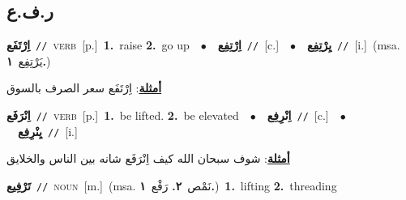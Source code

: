 \documentclass[10pt,a4paper,twoside]{article} %
\begin{document}
\begin{multicols}{2}
\vspace{-3mm}
\subsection*{\color{blue}\foreignlanguage{arabic}{ر.ف.ع}\color{blue}{}} 

{\setlength\topsep{0pt}\textbf{\foreignlanguage{arabic}{اِرْتَفَع}}\ {\color{gray}\texttt{//}\color{black}}\ \textsc{verb}\ [p.]\ \textbf{1.}~raise  \textbf{2.}~go up\ \ $\bullet$\ \ \setlength\topsep{0pt}\textbf{\foreignlanguage{arabic}{اِرْتِفِع}}\ {\color{gray}\texttt{//}\color{black}}\ [c.]\ \ $\bullet$\ \ \setlength\topsep{0pt}\textbf{\foreignlanguage{arabic}{يِرْتِفِع}}\ {\color{gray}\texttt{//}\color{black}}\ [i.]\ \color{gray}(msa. \foreignlanguage{arabic}{يَرْتِفِع}~\foreignlanguage{arabic}{\textbf{١.}})\color{black}\  \begin{flushright}\color{gray}\foreignlanguage{arabic}{\textbf{\underline{\foreignlanguage{arabic}{أمثلة}}}: اِرْتَفَع سعر الصرف بالسوق}\end{flushright}\color{black}} \vspace{2mm}

{\setlength\topsep{0pt}\textbf{\foreignlanguage{arabic}{اِنْرَفَع}}\ {\color{gray}\texttt{//}\color{black}}\ \textsc{verb}\ [p.]\ \textbf{1.}~be lifted.  \textbf{2.}~be elevated\ \ $\bullet$\ \ \setlength\topsep{0pt}\textbf{\foreignlanguage{arabic}{اِنْرِفِع}}\ {\color{gray}\texttt{//}\color{black}}\ [c.]\ \ $\bullet$\ \ \setlength\topsep{0pt}\textbf{\foreignlanguage{arabic}{يِنْرِفِع}}\ {\color{gray}\texttt{//}\color{black}}\ [i.]\  \begin{flushright}\color{gray}\foreignlanguage{arabic}{\textbf{\underline{\foreignlanguage{arabic}{أمثلة}}}: شوف سبحان الله كيف اِنْرَفَع شانه بين الناس والخلايق}\end{flushright}\color{black}} \vspace{2mm}

{\setlength\topsep{0pt}\textbf{\foreignlanguage{arabic}{تَرْفِيع}}\ {\color{gray}\texttt{//}\color{black}}\ \textsc{noun}\ [m.]\ \color{gray}(msa. \foreignlanguage{arabic}{نَمْص}~\foreignlanguage{arabic}{\textbf{٢.}}  \foreignlanguage{arabic}{رَفْع}~\foreignlanguage{arabic}{\textbf{١.}})\color{black}\ \textbf{1.}~lifting  \textbf{2.}~threading\ } \vspace{2mm}


\end{multicols}
\end{document}
